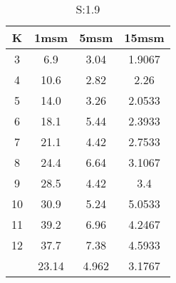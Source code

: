 \begin{table}[H]
\centering
\begin{tabular}{c|ccc}
K &1msm &5msm &15msm\\
\hline
3 & 6.9 & 3.04 & 1.9067\\
4 & 10.6 & 2.82 & 2.26\\
5 & 14.0 & 3.26 & 2.0533\\
6 & 18.1 & 5.44 & 2.3933\\
7 & 21.1 & 4.42 & 2.7533\\
8 & 24.4 & 6.64 & 3.1067\\
9 & 28.5 & 4.42 & 3.4\\
10 & 30.9 & 5.24 & 5.0533\\
11 & 39.2 & 6.96 & 4.2467\\
12 & 37.7 & 7.38 & 4.5933\\
\hline
& 23.14 & 4.962 & 3.1767\\
\end{tabular}
\caption{S:1.9}
\label{tab:s1.9}
\end{table}

